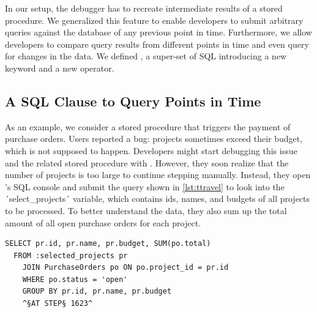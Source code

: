 %

\tmpStart

In our setup, the debugger has to recreate intermediate results of a stored procedure.
We generalized this feature to enable developers to submit arbitrary queries against the database of any previous point in time.
Furthermore, we allow developers to compare query results from different points in time and even query for changes in the data.
We defined \SQLextension, a super-set of SQL introducing a new keyword and a new operator.

\subsection{A SQL Clause to Query Points in Time}

As an example, we consider a stored procedure that triggers the payment of purchase orders.
Users reported a bug: projects sometimes exceed their budget, which is not supposed to happen.
Developers might start debugging this issue and the related stored procedure with \tool.
However, they soon realize that the number of projects is too large to continue stepping manually.
Instead, they open \tool's SQL console and submit the query shown in \cref{lst:ttravel} to look into the ´select_projects´ variable, which contains ids, names, and budgets of all projects to be processed.
To better understand the data, they also sum up the total amount of all open purchase orders for each project.


\begin{lstlisting}[language=HanaSQL,float,caption={Example for a time-travel query: select the current total of open orders for previously selected projects at step 1623 of the execution},label=lst:ttravel]
  SELECT pr.id, pr.name, pr.budget, SUM(po.total)
  FROM :selected_projects pr
	JOIN PurchaseOrders po ON po.project_id = pr.id
	WHERE po.status = 'open'
	GROUP BY pr.id, pr.name, pr.budget
	^§AT STEP§ 1623^
\end{lstlisting}

